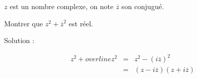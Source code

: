 \documentclass[a4paper,12pt]{article}
\title{}
\author{}
\date{}
\begin{document}
$z$ est un nombre complexe, on note $\overline{z}$ son conjugué.

Montrer que $z^2+\overline{z}^2$ est réel.

Solution :

\[
\begin{array}{rcl}
  z^2+overline{z}^2&=&z^2-\left(i\overline{z}\right)^2\\
  &=&\left(z-i\overline{z}\right)\left(z+i\overline{z}\right)
\end{array}
\]
\end{document}
